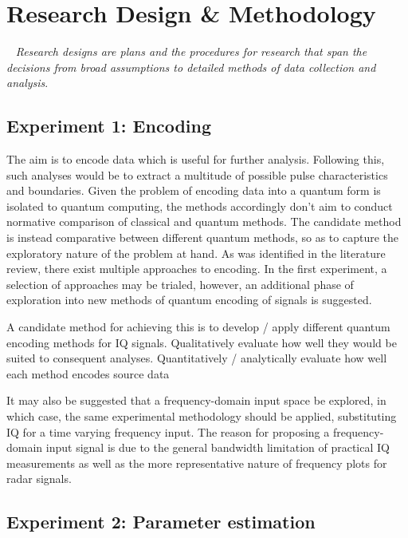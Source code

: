 \section{Research Design \& Methodology}~\label{sec:design}
\textit{Research designs are plans and the procedures for research that span the decisions from broad assumptions to detailed methods of data collection and analysis}.

\subsection{Experiment 1: Encoding}
The aim is to encode data which is useful for further analysis. Following this, such  analyses would be to extract a multitude of possible pulse characteristics and boundaries.
Given the problem of encoding data into a quantum form is isolated to quantum computing, the methods accordingly don't aim to conduct normative comparison of classical and quantum methods. The candidate method is instead comparative between different quantum methods, so as to capture the exploratory nature of the problem at hand.
As was identified in the literature review, there exist multiple approaches to encoding. In the first experiment, a selection of approaches may be trialed, however, an additional phase of exploration into new methods of quantum encoding of signals is suggested.

A candidate method for achieving this is to develop / apply different quantum encoding methods for IQ signals.
Qualitatively evaluate how well they would be suited to consequent analyses.
Quantitatively / analytically evaluate how well each method encodes source data

It may also be suggested that a frequency-domain input space be explored, in which case, the same experimental methodology should be applied, substituting IQ for a time varying frequency input. The reason for proposing a frequency-domain input signal is due to the general bandwidth limitation of practical IQ measurements as well as the more representative nature of frequency plots for radar signals.

\subsection{Experiment 2: Parameter estimation}

